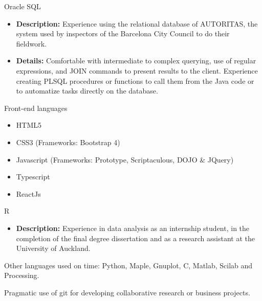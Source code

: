 \documentclass[a4paper,10pt]{article}
\begin{document}
{    \vspace{10pt}
    
    Oracle SQL
    \begin{itemize}
        \item \textbf{Description:} Experience using the relational database of AUTORITAS, the system used by inspectors of the Barcelona City Council to do their fieldwork. 
        \item \textbf{Details:} Comfortable with intermediate to complex querying, use of regular expressions, and JOIN commands to present results to the client. Experience creating PLSQL procedures or functions to call them from the Java code or to automatize tasks directly on the database.
    \end{itemize}
    
    \vspace{10pt}
    
    Front-end languages
    \begin{itemize}
        \item HTML5 
        \item CSS3 (Frameworks: Bootstrap 4)
        \item Javascript (Frameworks: Prototype, Scriptaculous, DOJO \& JQuery)
        \item Typescript
        \item ReactJs
    \end{itemize}
    
    \vspace{10pt}

    R
    \begin{itemize}
        \item \textbf{Description:} Experience in data analysis as an internship student, in the completion of the final degree dissertation and as a research assistant at the University of Auckland. 
    \end{itemize}

     \vspace{10pt}
    
    Other languages used on time: Python, Maple, Gnuplot, C, Matlab, Scilab and Processing.
    
    \vspace{10pt}
    
    Pragmatic use of git for developing collaborative research or business projects.
    
}
\end{document}
